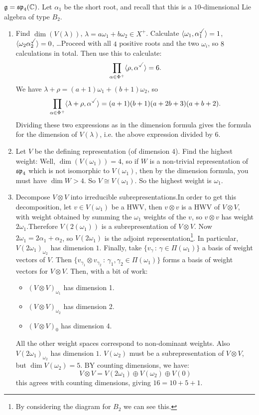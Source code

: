 \documentclass{article}
\begin{document}
\begin{ex*}
    $\mathfrak{g} = \mathfrak{sp}_{4}(\mathbb{C})$. Let $\alpha_{1}$ be the short root, and recall that this is a $10$-dimensional Lie algebra of type $B_{2}$.
    \begin{enumerate}
        \item Find $\dim(V(\lambda))$, $\lambda =a \omega_{1} + b \omega_{2} \in X^{+}$. Calculate $\langle \omega_{1}, \alpha_{1}^{\checked} \rangle =1$, $\langle  \omega_{2} \alpha_{2}^{\checked} \rangle = 0$, \dots Proceed with all $4$ positive roots and the two $\omega_{i}$, so $8$ calculations in total. Then use this to calculate: \[ \prod_{\alpha \in \Phi^{+}} \langle \rho, \alpha^{\checked} \rangle = 6.\]
        We have $\lambda + \rho = (a+1)\omega_{1} + (b+1)\omega_{2}$, so \[ \prod_{\alpha \in \Phi^{+}} \langle \lambda + \rho, \alpha^{\checked} \rangle = (a+1)(b+1)(a+2b+3)(a+b+2).\]  Dividing these two expressions as in the dimension formula gives the formula for the dimension of $V(\lambda)$, i.e. the above expression divided by $6$.
        \item Let $V$ be the defining representation (of dimension $4$). Find the highest weight: \gap Well, $\dim(V(\omega_{1}))=4$, so if $W$ is a non-trivial representation of $\mathfrak{sp}_{4}$ which is not isomorphic to $V(\omega_{1})$, then by the dimension formula, you must have $\dim W > 4$. So $V \cong V(\omega_{1})$. So the highest weight is $\omega_{1}$.
        \item Decompose $V \otimes V$ into irreducible subrepresentations.\gap In order to get this decomposition, let $v \in V(\omega_{1})$ be a HWV, then $v \otimes v$ is a HWV of $V \otimes V$, with weight obtained by summing the $\omega_{1}$ weights of the $v$, so $v \otimes v$ has weight $2\omega_{1}$.\gap Therefore $V(2(\omega_{1}))$ is a subrepresentation of $V \otimes V$. Now $2\omega_{1} = 2\alpha_{1} + \alpha_{2}$, so $V(2\omega_{1})$ is the adjoint representation\footnote{By considering the diagram for $B_{2}$ we can see this.}. In particular, $V(2\omega_{1})_{\omega_{2}}$ has dimension $1$. \gap Finally, take $\{ v_{\gamma} \, : \, \gamma \in \Pi( \omega_{1})\}$ a basis of weight vectors of $V$. Then $\{ v_{\gamma_{1}} \otimes v_{\gamma_{2}} \, : \, \gamma_{1}, \gamma_{2} \in \Pi(\omega_{1})\}$ forms a basis of weight vectors for $V \otimes V$. \gap Then, with a bit of work: \begin{itemize}
            \item $(V \otimes V)_{\omega_{1}}$ has dimension 1.
            \item $(V \otimes V)_{\omega_{2}}$ has dimension 2.
            \item $(V \otimes V)_{0}$ has dimension 4.
        \end{itemize}
        All the other weight spaces correspond to non-dominant weights. Also $V(2\omega_{1})_{\omega_{2}}$ has dimension $1$. $V(\omega_{2})$ must be a subrepresentation of $V \otimes V$, but $\dim V(\omega_{2}) = 5$. BY counting dimensions, we have: \[ V \otimes V = V(2\omega_{1}) \oplus V(\omega_{2}) \oplus V(0)\]
        this agrees with counting dimensions, giving $16 = 10 + 5 + 1$.
    \end{enumerate}
\end{ex*}
\end{document}
